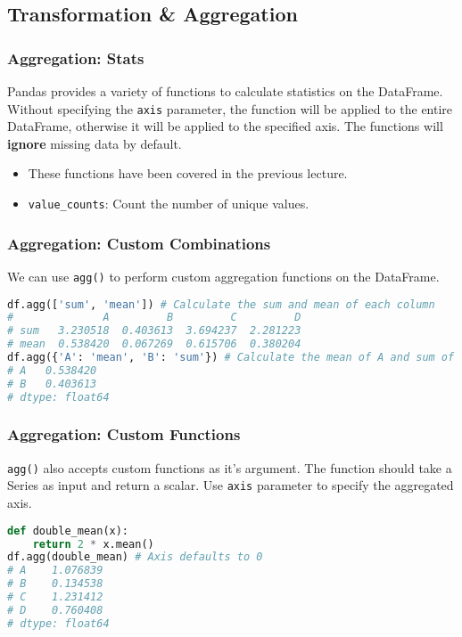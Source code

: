 \documentclass[beamer, en, version=2.0]{huangfusl-template}
\begin{document}
    \subsection{Transformation \& Aggregation}
    \begin{frame}[fragile]
        \frametitle{Aggregation: Stats}

        Pandas provides a variety of functions to calculate statistics on the DataFrame. Without specifying the {\color{blue}\footnotesize\verb|axis|} parameter, the function will be applied to the entire DataFrame, otherwise it will be applied to the specified axis. The functions will \textbf{ignore} missing data by default.

        \begin{itemize}
            \item These functions have been covered in the previous lecture.
            \item {\color{blue}\footnotesize\verb|value_counts|}: Count the number of unique values.
        \end{itemize}
    \end{frame}
    \begin{frame}[fragile]
        \frametitle{Aggregation: Custom Combinations}

        We can use {\color{blue}\footnotesize\verb|agg()|} to perform custom aggregation functions on the DataFrame.

\begin{lstlisting}[language=python]
df.agg(['sum', 'mean']) # Calculate the sum and mean of each column
#              A         B         C         D
# sum   3.230518  0.403613  3.694237  2.281223
# mean  0.538420  0.067269  0.615706  0.380204
df.agg({'A': 'mean', 'B': 'sum'}) # Calculate the mean of A and sum of B
# A   0.538420
# B   0.403613
# dtype: float64
\end{lstlisting}
    \end{frame}
    \begin{frame}[fragile]
        \frametitle{Aggregation: Custom Functions}

        {\color{blue}\footnotesize\verb|agg()|} also accepts custom functions as it's argument. The function should take a Series as input and return a scalar. Use {\color{blue}\footnotesize\verb|axis|} parameter to specify the aggregated axis.

\begin{lstlisting}[language=python]
def double_mean(x):
    return 2 * x.mean()
df.agg(double_mean) # Axis defaults to 0
# A    1.076839
# B    0.134538
# C    1.231412
# D    0.760408
# dtype: float64
\end{lstlisting}
    \end{frame}
\end{document}
